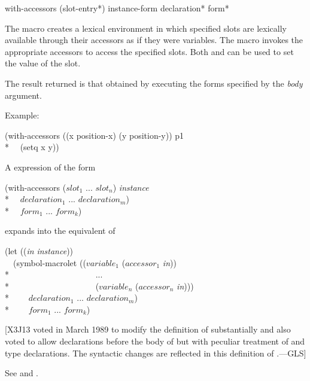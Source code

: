 \begin{defmac}
with-accessors ({slot-entry}*) instance-form
     {declaration}* {form}*

The macro  creates a lexical environment in which
specified slots are lexically available through their accessors as if
they were variables.  The macro  invokes the
appropriate accessors to access the specified slots.  Both 
and  can be used to set the value of the slot. 

The result returned is that obtained by executing the forms specified
by the \emph{body} argument.

Example:

\begin{lisp}
(with-accessors ((x position-x) (y position-y)) p1 \\*
~~(setq x y))
\end{lisp}


A  expression of the form
\begin{lisp}
(with-accessors (\textrm{$slot_1$} ... \textrm{$slot_{n}$}) \emph{instance} \\*
~~$declaration_1$ ... $declaration_{m}$) \\*
~~$form_1$ ... $form_{k}$)
\end{lisp}
expands into the equivalent of
\begin{lisp}
(let ((\emph{in} \emph{instance})) \\
~~(symbol-macrolet ((\textrm{$variable_1$} (\textrm{$accessor_1$} \emph{in})) \\*
~~~~~~~~~~~~~~~~~~~~... \\*
~~~~~~~~~~~~~~~~~~~~(\textrm{$variable_{n}$} (\textrm{$accessor_{n}$} \emph{in}))) \\*
~~~~$declaration_1$ ... $declaration_{m}$) \\*
~~~~$form_1$ ... $form_{k}$)
\end{lisp}


[X3J13 voted in March 1989
to modify the definition of  substantially
and also voted
 to allow declarations before the body
of  but with peculiar treatment of 
and type declarations.  The syntactic changes are reflected in this definition
of .---GLS]

See  and .
\end{defmac}

